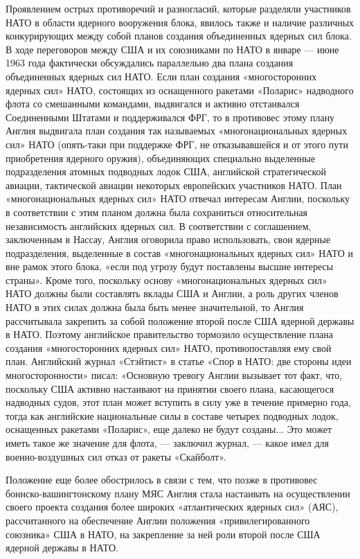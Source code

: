 \documentclass[12pt, a4paper, openany]{book}
\begin{document}
		Проявлением острых противоречий и разногласий, которые разделяли участников НАТО в области ядерного вооружения блока, явилось также и наличие различных конкурирующих между собой планов создания объединенных ядерных сил блока. В ходе переговоров между США и их союзниками по НАТО в январе — июне 1963 года фактически обсуждались параллельно два плана создания объединенных ядерных сил НАТО. Если план создания «многосторонних ядерных сил» НАТО, состоящих из оснащенного ракетами «Поларис» надводного флота со смешанными командами, выдвигался и активно отстаивался Соединенными Штатами и поддерживался ФРГ, то в противовес этому плану Англия выдвигала план создания так называемых «многонациональных ядерных сил» НАТО (опять-таки при поддержке ФРГ, не отказывавшейся и от этого пути приобретения ядерного оружия), объединяющих специально выделенные подразделения атомных подводных лодок США, английской стратегической авиации, тактической авиации некоторых европейских участников НАТО. План «многонациональных ядерных сил» НАТО отвечал интересам Англии, поскольку в соответствии с этим планом должна была сохраниться относительная независимость английских ядерных сил. В соответствии с соглашением, заключенным в Нассау, Англия оговорила право использовать, свои ядерные подразделения, выделенные в состав «многонациональных ядерных сил» НАТО и вне рамок этого блока, «если под угрозу будут поставлены высшие интересы страны». Кроме того, поскольку основу «многонациональных ядерных сил» НАТО должны были составлять вклады США и Англии, а роль других членов НАТО в этих силах должна была быть менее значительной, то Англия рассчитывала закрепить за собой положение второй после США ядерной державы в НАТО. Поэтому английское правительство тормозило осуществление плана создания «многосторонних ядерных сил» НАТО, противопоставляя ему свой план. Английский журнал «Стэйтист» в статье «Спор в НАТО: две стороны идеи многосторонности» писал: «Основную тревогу Англии вызывает тот факт, что, поскольку США активно настаивают на принятии своего плана, касающегося надводных судов, этот план может вступить в силу уже в течение примерно года, тогда как английские национальные силы в составе четырех подводных лодок, оснащенных ракетами «Поларис», еще далеко не будут созданы... Это может иметь такое же значение для флота, — заключил журнал, — какое имел для военно-воздушных сил отказ от ракеты «Скайболт».
		
		Положение еще более обострилось в связи с тем, что позже в противовес боннско-вашингтонскому плану МЯС Англия стала настаивать на осуществлении своего проекта создания более широких «атлантических ядерных сил» (АЯС), рассчитанного на обеспечение Англии положения «привилегированного союзника» США в НАТО, на закрепление за ней роли второй после США ядерной державы в НАТО.
		
\end{document}

